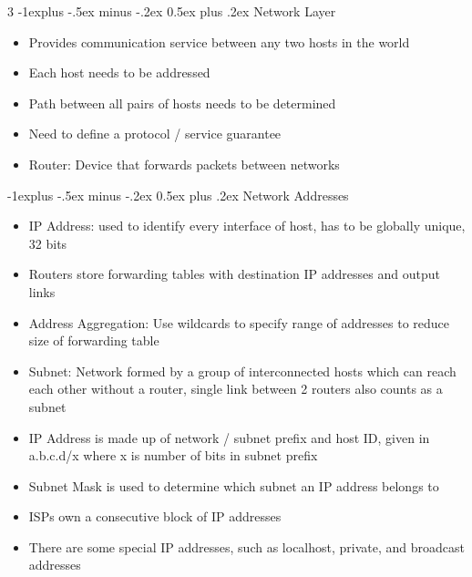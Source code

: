 \documentclass[10pt, landscape]{article}
\makeatletter
\renewcommand{\section}{\@startsection{section}{1}{0mm}%
                                {-1ex plus -.5ex minus -.2ex}%
                                {0.5ex plus .2ex}%
                                {\normalfont\large\bfseries}}
\renewcommand{\section}{\@startsection{section}{2}{0mm}%
                                {-1explus -.5ex minus -.2ex}%
                                {0.5ex plus .2ex}%
                                {\normalfont\normalsize\bfseries}}
\makeatother
\begin{document}
\begin{multicols*}{3}
\section{Network Layer}
\begin{itemize}
    \item Provides communication service between any two hosts in the world
    \item Each host needs to be addressed
    \item Path between all pairs of hosts needs to be determined
    \item Need to define a protocol / service guarantee
    \item Router: Device that forwards packets between networks
\end{itemize}

\section{Network Addresses}
\begin{itemize}
    \item IP Address: used to identify every interface of host, has to be globally unique, 32 bits
    \item Routers store forwarding tables with destination IP addresses and output links
    \item Address Aggregation: Use wildcards to specify range of addresses to reduce size of forwarding table
    \item Subnet: Network formed by a group of interconnected hosts which can reach each other without a router, single link between 2 routers also counts as a subnet
    \item IP Address is made up of network / subnet prefix and host ID, given in a.b.c.d/x where x is number of bits in subnet prefix
    \item Subnet Mask is used to determine which subnet an IP address belongs to
    \item ISPs own a consecutive block of IP addresses
    \item There are some special IP addresses, such as localhost, private, and broadcast addresses
\end{itemize}


\end{multicols*}
\end{document}
